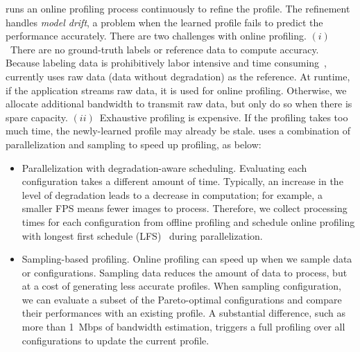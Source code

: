
 \sysname{} runs an online profiling process
continuously to refine the profile. The refinement handles \textit{model drift},
a problem when the learned profile fails to predict the performance
accurately. There are two challenges with online profiling.  $(i)$~There are no
ground-truth labels or reference data to compute accuracy. Because labeling data
is prohibitively labor intensive and time consuming~\cite{russell2008labelme},
\sysname{} currently uses raw data (data without degradation) as the
reference. At runtime, if the application streams raw data, it is used for
online profiling. Otherwise, we allocate additional bandwidth to transmit raw
data, but only do so when there is spare capacity. $(ii)$~Exhaustive profiling
is expensive. If the profiling takes too much time, the newly-learned profile
may already be stale. \sysname{} uses a combination of parallelization and
sampling to speed up profiling, as below:

\begin{itemize}[leftmargin=*, topsep=3pt]

\item Parallelization with degradation-aware scheduling. Evaluating each
  configuration takes a different amount of time. Typically, an increase in the
  level of degradation leads to a decrease in computation; for example, a
  smaller FPS means fewer images to process. Therefore, we collect processing
  times for each configuration from offline profiling and schedule online
  profiling with longest first schedule (LFS)~\cite{karger2010scheduling} during
  parallelization.

\item Sampling-based profiling. Online profiling can speed up when we sample
  data or configurations. Sampling data reduces the amount of data to process,
  but at a cost of generating less accurate profiles. When sampling
  configuration, we can evaluate a subset of the Pareto-optimal configurations
  and compare their performances with an existing profile. A substantial
  difference, such as more than \SI{1}{Mbps} of bandwidth estimation, triggers a
  full profiling over all configurations to update the current profile.

\end{itemize}


